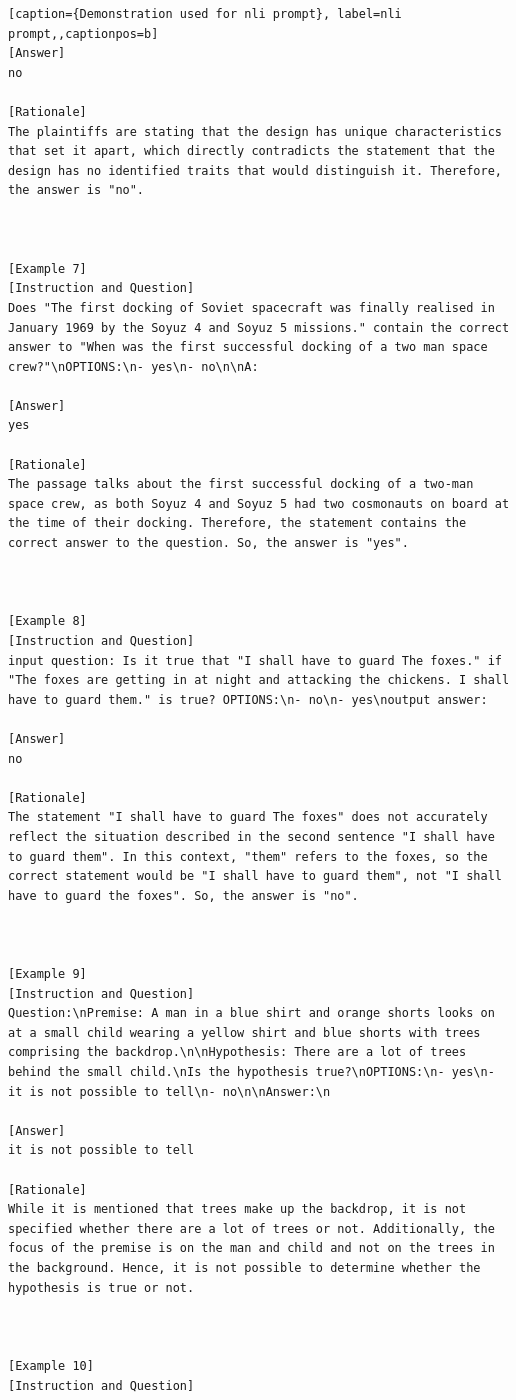 \begin{lstlisting}[caption={Demonstration used for nli prompt}, label=nli prompt,,captionpos=b]
[Answer]
no

[Rationale]
The plaintiffs are stating that the design has unique characteristics that set it apart, which directly contradicts the statement that the design has no identified traits that would distinguish it. Therefore, the answer is "no".



[Example 7]
[Instruction and Question]
Does "The first docking of Soviet spacecraft was finally realised in January 1969 by the Soyuz 4 and Soyuz 5 missions." contain the correct answer to "When was the first successful docking of a two man space crew?"\nOPTIONS:\n- yes\n- no\n\nA:

[Answer]
yes

[Rationale]
The passage talks about the first successful docking of a two-man space crew, as both Soyuz 4 and Soyuz 5 had two cosmonauts on board at the time of their docking. Therefore, the statement contains the correct answer to the question. So, the answer is "yes".



[Example 8]
[Instruction and Question]
input question: Is it true that "I shall have to guard The foxes." if "The foxes are getting in at night and attacking the chickens. I shall have to guard them." is true? OPTIONS:\n- no\n- yes\noutput answer: 

[Answer]
no

[Rationale]
The statement "I shall have to guard The foxes" does not accurately reflect the situation described in the second sentence "I shall have to guard them". In this context, "them" refers to the foxes, so the correct statement would be "I shall have to guard them", not "I shall have to guard the foxes". So, the answer is "no".



[Example 9]
[Instruction and Question]
Question:\nPremise: A man in a blue shirt and orange shorts looks on at a small child wearing a yellow shirt and blue shorts with trees comprising the backdrop.\n\nHypothesis: There are a lot of trees behind the small child.\nIs the hypothesis true?\nOPTIONS:\n- yes\n- it is not possible to tell\n- no\n\nAnswer:\n

[Answer]
it is not possible to tell

[Rationale]
While it is mentioned that trees make up the backdrop, it is not specified whether there are a lot of trees or not. Additionally, the focus of the premise is on the man and child and not on the trees in the background. Hence, it is not possible to determine whether the hypothesis is true or not.



[Example 10]
[Instruction and Question]

    \end{lstlisting}
    




